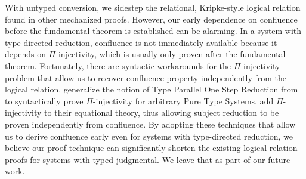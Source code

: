 \documentclass[acmsmall,screen=true,
\ifpublic review=false\else,review=true\fi
  ,anonymous=\ifanonymous true\else false\fi]{acmart}
\newcommand{\scw}[1]{}
\newcommand{\yl}[1]{}
\begin{document}
With untyped conversion,
we sidestep the relational, Kripke-style logical relation found in
other mechanized proofs. \scw{Need to define Kripke-style. Also the other
proofs need Kripke style because they are defining typed relations, not untyped
relations. }
However, our early dependence on confluence
before the fundamental theorem is established can be alarming.
In a system with type-directed reduction,
confluence is not immediately available because it
depends on $\Pi$-injectivity, which is usually only proven after the
fundamental theorem.\scw{confluence depends on Pi injectivity? I thought
it was only needed for subject reduction}\yl{it's
transitive. Confluence depends on subject reduction, which in turn
depends on pi injectivity. Maybe it's worth spelling out the details}
Fortunately, there are syntactic workarounds for the $\Pi$-injectivity
problem that allow us to recover confluence property independently
from the logical relation. \citet{siles2012pure} generalize the
notion of Type Parallel One Step Reduction from \citet{adams2006pure}
to syntactically prove $\Pi$-injectivity for arbitrary Pure Type
Systems. \citet{weirich:systemd} add $\Pi$-injectivity to their
equational theory, thus allowing subject reduction to be proven
independently from confluence. By adopting these techniques that allow
us to derive confluence early even for systems with type-directed
reduction, we believe our proof technique can significantly shorten
the existing logical relation proofs for systems with typed
judgmental. We leave that as part of our future work.
\end{document}
